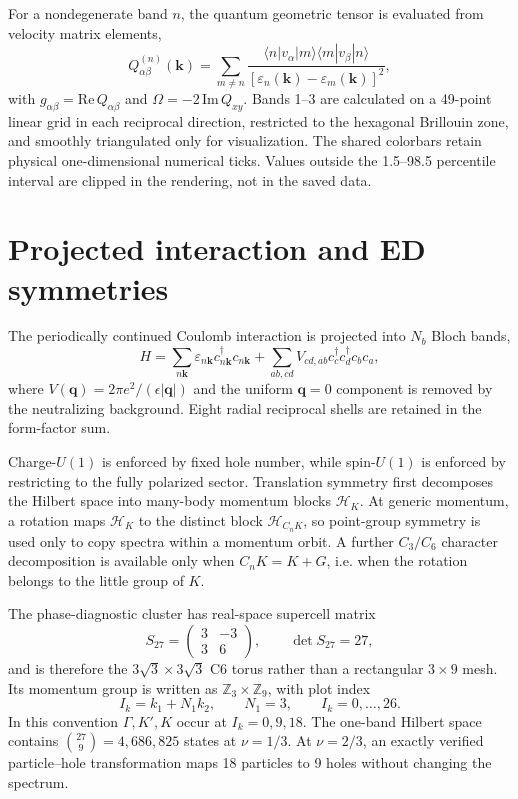 \documentclass[10pt,twocolumn]{article}
\begin{document}
For a nondegenerate band $n$, the quantum geometric tensor is evaluated from velocity matrix elements,
\begin{equation}
Q^{(n)}_{\alpha\beta}(\bm k)=
\sum_{m\ne n}\frac{\langle n|v_\alpha|m\rangle
\langle m|v_\beta|n\rangle}{[\varepsilon_n(\bm k)-\varepsilon_m(\bm k)]^2},
\end{equation}
with $g_{\alpha\beta}=\mathrm{Re}\,Q_{\alpha\beta}$ and
$\Omega=-2\,\mathrm{Im}\,Q_{xy}$.  Bands 1--3 are calculated on a 49-point linear grid in each reciprocal direction, restricted to the hexagonal Brillouin zone, and smoothly triangulated only for visualization.  The shared colorbars retain physical one-dimensional numerical ticks.  Values outside the 1.5--98.5 percentile interval are clipped in the rendering, not in the saved data.

\section{Projected interaction and ED symmetries}

The periodically continued Coulomb interaction is projected into $N_b$ Bloch bands,
\begin{equation}
H=\sum_{n\bm k}\varepsilon_{n\bm k}c^\dagger_{n\bm k}c_{n\bm k}
+\sum_{ab,cd}V_{cd,ab}c_c^\dagger c_d^\dagger c_b c_a,
\end{equation}
where $V(\bm q)=2\pi e^2/(\epsilon|\bm q|)$ and the uniform $\bm q=0$ component is removed by the neutralizing background.  Eight radial reciprocal shells are retained in the form-factor sum.

Charge-$U(1)$ is enforced by fixed hole number, while spin-$U(1)$ is enforced
by restricting to the fully polarized sector.  Translation symmetry first
decomposes the Hilbert space into many-body momentum blocks $\mathcal H_K$.
At generic momentum, a rotation maps $\mathcal H_K$ to the distinct block
$\mathcal H_{C_nK}$, so point-group symmetry is used only to copy spectra
within a momentum orbit.  A further $C_3/C_6$ character decomposition is
available only when $C_nK=K+G$, i.e. when the rotation belongs to the little
group of $K$.

The phase-diagnostic cluster has real-space supercell matrix
\begin{equation}
S_{27}=\begin{pmatrix}3&-3\\3&6\end{pmatrix},\qquad \det S_{27}=27,
\end{equation}
and is therefore the $3\sqrt3\times3\sqrt3$ C6 torus rather than a rectangular $3\times9$ mesh.  Its momentum group is written as $\mathbb Z_3\times\mathbb Z_9$, with plot index
\begin{equation}
I_k=k_1+N_1k_2,\qquad N_1=3,\qquad I_k=0,\ldots,26.
\end{equation}
In this convention $\Gamma,K',K$ occur at $I_k=0,9,18$.  The one-band Hilbert space contains $\binom{27}{9}=4{,}686{,}825$ states at $\nu=1/3$.  At $\nu=2/3$, an exactly verified particle--hole transformation maps 18 particles to 9 holes without changing the spectrum.
\end{document}
